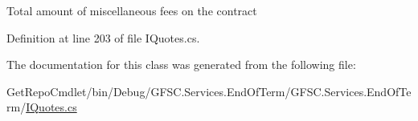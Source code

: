 Total amount of miscellaneous fees on the contract 



Definition at line 203 of file I\+Quotes.\+cs.



The documentation for this class was generated from the following file\+:\begin{DoxyCompactItemize}
\item 
Get\+Repo\+Cmdlet/bin/\+Debug/\+G\+F\+S\+C.\+Services.\+End\+Of\+Term/\+G\+F\+S\+C.\+Services.\+End\+Of\+Term/\mbox{\hyperlink{_i_quotes_8cs}{I\+Quotes.\+cs}}\end{DoxyCompactItemize}
